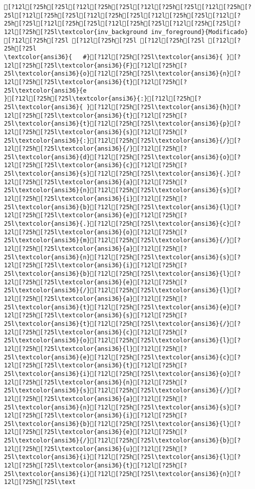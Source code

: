 \documentclass{scrartcl}
\begin{document}
\begin{Verbatim}
[?12l[?25h[?25l[?12l[?25h[?25l[?12l[?25h[?25l[?12l[?25h[?25l[?12l[?25h[?25l[?12l[?25h[?25l[?12l[?25h[?25l[?12l[?25h[?25l[?12l[?25h[?25l[?12l[?25h[?25l[?12l[?25h[?25l[?12l[?25h[?25l\textcolor{inv_background inv_foreground}{Modificado}
[?12l[?25h[?25l [?12l[?25h[?25l [?12l[?25h[?25l [?12l[?25h[?25l
\textcolor{ansi36}{   #}[?12l[?25h[?25l\textcolor{ansi36}{ }[?12l[?25h[?25l\textcolor{ansi36}{F}[?12l[?25h[?25l\textcolor{ansi36}{o}[?12l[?25h[?25l\textcolor{ansi36}{n}[?12l[?25h[?25l\textcolor{ansi36}{t}[?12l[?25h[?25l\textcolor{ansi36}{e
}[?12l[?25h[?25l\textcolor{ansi36}{:}[?12l[?25h[?25l\textcolor{ansi36}{ }[?12l[?25h[?25l\textcolor{ansi36}{h}[?12l[?25h[?25l\textcolor{ansi36}{t}[?12l[?25h[?25l\textcolor{ansi36}{t}[?12l[?25h[?25l\textcolor{ansi36}{p}[?12l[?25h[?25l\textcolor{ansi36}{s}[?12l[?25h[?25l\textcolor{ansi36}{:}[?12l[?25h[?25l\textcolor{ansi36}{/}[?12l[?25h[?25l\textcolor{ansi36}{/}[?12l[?25h[?25l\textcolor{ansi36}{d}[?12l[?25h[?25l\textcolor{ansi36}{o}[?12l[?25h[?25l\textcolor{ansi36}{c}[?12l[?25h[?25l\textcolor{ansi36}{s}[?12l[?25h[?25l\textcolor{ansi36}{.}[?12l[?25h[?25l\textcolor{ansi36}{a}[?12l[?25h[?25l\textcolor{ansi36}{n}[?12l[?25h[?25l\textcolor{ansi36}{s}[?12l[?25h[?25l\textcolor{ansi36}{i}[?12l[?25h[?25l\textcolor{ansi36}{b}[?12l[?25h[?25l\textcolor{ansi36}{l}[?12l[?25h[?25l\textcolor{ansi36}{e}[?12l[?25h[?25l\textcolor{ansi36}{.}[?12l[?25h[?25l\textcolor{ansi36}{c}[?12l[?25h[?25l\textcolor{ansi36}{o}[?12l[?25h[?25l\textcolor{ansi36}{m}[?12l[?25h[?25l\textcolor{ansi36}{/}[?12l[?25h[?25l\textcolor{ansi36}{a}[?12l[?25h[?25l\textcolor{ansi36}{n}[?12l[?25h[?25l\textcolor{ansi36}{s}[?12l[?25h[?25l\textcolor{ansi36}{i}[?12l[?25h[?25l\textcolor{ansi36}{b}[?12l[?25h[?25l\textcolor{ansi36}{l}[?12l[?25h[?25l\textcolor{ansi36}{e}[?12l[?25h[?25l\textcolor{ansi36}{/}[?12l[?25h[?25l\textcolor{ansi36}{l}[?12l[?25h[?25l\textcolor{ansi36}{a}[?12l[?25h[?25l\textcolor{ansi36}{t}[?12l[?25h[?25l\textcolor{ansi36}{e}[?12l[?25h[?25l\textcolor{ansi36}{s}[?12l[?25h[?25l\textcolor{ansi36}{t}[?12l[?25h[?25l\textcolor{ansi36}{/}[?12l[?25h[?25l\textcolor{ansi36}{c}[?12l[?25h[?25l\textcolor{ansi36}{o}[?12l[?25h[?25l\textcolor{ansi36}{l}[?12l[?25h[?25l\textcolor{ansi36}{l}[?12l[?25h[?25l\textcolor{ansi36}{e}[?12l[?25h[?25l\textcolor{ansi36}{c}[?12l[?25h[?25l\textcolor{ansi36}{t}[?12l[?25h[?25l\textcolor{ansi36}{i}[?12l[?25h[?25l\textcolor{ansi36}{o}[?12l[?25h[?25l\textcolor{ansi36}{n}[?12l[?25h[?25l\textcolor{ansi36}{s}[?12l[?25h[?25l\textcolor{ansi36}{/}[?12l[?25h[?25l\textcolor{ansi36}{a}[?12l[?25h[?25l\textcolor{ansi36}{n}[?12l[?25h[?25l\textcolor{ansi36}{s}[?12l[?25h[?25l\textcolor{ansi36}{i}[?12l[?25h[?25l\textcolor{ansi36}{b}[?12l[?25h[?25l\textcolor{ansi36}{l}[?12l[?25h[?25l\textcolor{ansi36}{e}[?12l[?25h[?25l\textcolor{ansi36}{/}[?12l[?25h[?25l\textcolor{ansi36}{b}[?12l[?25h[?25l\textcolor{ansi36}{u}[?12l[?25h[?25l\textcolor{ansi36}{i}[?12l[?25h[?25l\textcolor{ansi36}{l}[?12l[?25h[?25l\textcolor{ansi36}{t}[?12l[?25h[?25l\textcolor{ansi36}{i}[?12l[?25h[?25l\textcolor{ansi36}{n}[?12l[?25h[?25l\text
\end{Verbatim}
\end{document}
